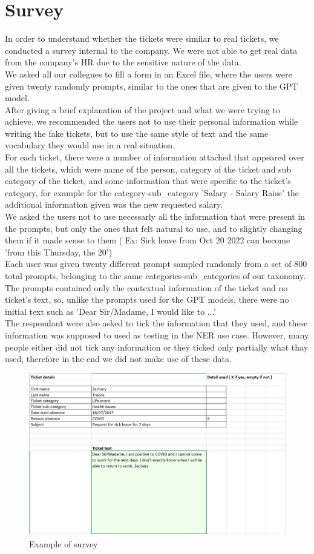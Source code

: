 \section{Survey}
In order to understand whether the tickets were similar to real tickets, we conducted a survey internal to the company. We were not able to get real data from the company's HR due to the sensitive nature of the data. \\
We asked all our collegues to fill a form in an Excel file, where the users were given twenty randomly prompts, similar to the ones that are given to the GPT model. \\
After giving a brief explanation of the project and what we were trying to achieve, we recommended the users not to use their personal information while writing the fake tickets, but to use the same style of text and the same vocabulary they would use in a real situation. \\
For each ticket, there were a number of information attached that appeared over all the tickets, which were name of the person, category of the ticket and sub category of the ticket, and some information that were specific to the ticket's category, for example for the category-sub\_category 'Salary - Salary Raise' the additional information given was the new requested salary. \\
We asked the users not to use necessarly all the information that were present in the prompts, but only the ones that felt natural to use, and to slightly changing them if it made sense to them ( Ex: Sick leave from Oct 20 2022 can become 'from this Thursday, the 20') \\
Each user was given twenty different prompt sampled randomly from a set of 800 total prompts, belonging to the same categories-sub\_categories of our taxonomy. The prompts contained only the contextual information of the ticket and no ticket's text, so, unlike the prompts used for the GPT models, there were no initial text such as 'Dear Sir/Madame, I would like to ...' \\
The respondant were also asked to tick the information that they used, and these information was supposed to used as testing in the NER use case. However, many people either did not tick any information or they ticked only partially what thay used, therefore in the end we did not make use of these data. \\

\begin{figure}[!h] 
    \includegraphics[width=\textwidth]{images/excel_schema_v2.PNG}
    \caption{Example of survey}
    \label{fig:survey}
\end{figure}    



